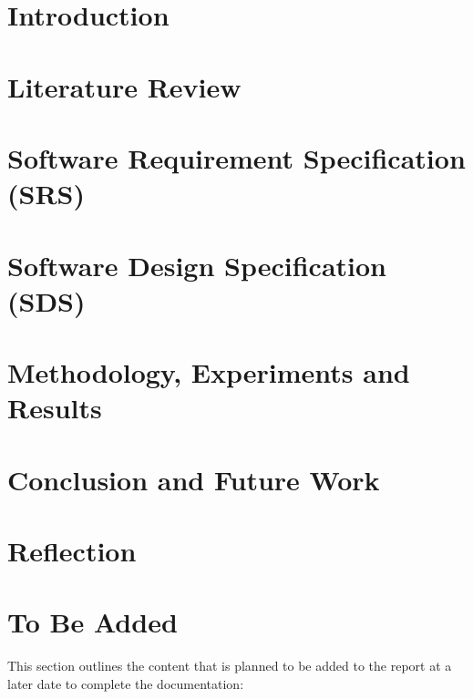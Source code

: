 \documentclass[12pt,twosided]{report}
\begin{document}
\chapter{Introduction}
\label{chap:intro}


\chapter{Literature Review}
\label{chap:lit}


\chapter{Software Requirement Specification (SRS)}
\label{chap:srs}


\chapter{Software Design Specification (SDS)}
\label{chap:sds}


\chapter{Methodology, Experiments and Results}
\label{chap:results}


\chapter{Conclusion and Future Work}
\label{chap:outro}


\chapter{Reflection}
\label{chap:Reflection}


\chapter*{To Be Added}

This section outlines the content that is planned to be added to the report at a later date to complete the documentation:
\end{document}
